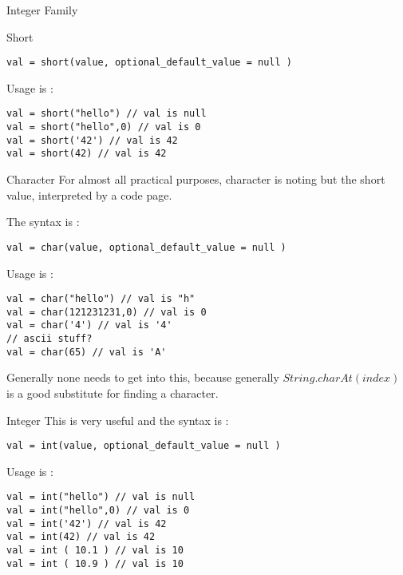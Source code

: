\begin{section}{Integer Family}
\begin{subsection}{Short}
\begin{lstlisting}[style=JexlStyle]
val = short(value, optional_default_value = null )
\end{lstlisting}

Usage is :

\begin{lstlisting}[style=JexlStyle]
val = short("hello") // val is null
val = short("hello",0) // val is 0
val = short('42') // val is 42 
val = short(42) // val is 42 
\end{lstlisting}

\end{subsection}

\begin{subsection}{Character}
For almost all practical purposes, character is noting but the short value, 
interpreted by a code page.

The syntax is :

\begin{lstlisting}[style=JexlStyle]
val = char(value, optional_default_value = null )
\end{lstlisting}

Usage is :

\begin{lstlisting}[style=JexlStyle]
val = char("hello") // val is "h"
val = char(121231231,0) // val is 0
val = char('4') // val is '4' 
// ascii stuff?
val = char(65) // val is 'A'  
\end{lstlisting}

Generally none needs to get into this, because generally $String.charAt(index)$ is a good substitute
for finding a character.
\end{subsection}

\begin{subsection}{Integer}
This is very useful and the syntax is :

\begin{lstlisting}[style=JexlStyle]
val = int(value, optional_default_value = null )
\end{lstlisting}

Usage is :

\begin{lstlisting}[style=JexlStyle]
val = int("hello") // val is null
val = int("hello",0) // val is 0
val = int('42') // val is 42 
val = int(42) // val is 42 
val = int ( 10.1 ) // val is 10 
val = int ( 10.9 ) // val is 10 
\end{lstlisting}

\end{subsection}



\end{section}
